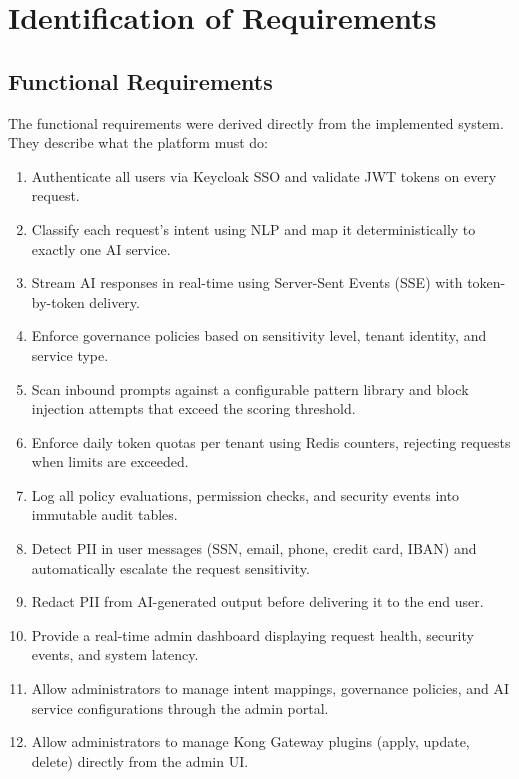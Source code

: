\section{Identification of Requirements}

\subsection{Functional Requirements}

The functional requirements were derived directly from the implemented system. They describe what the platform must do:

\begin{enumerate}
    \item Authenticate all users via Keycloak SSO and validate JWT tokens on every request.
    \item Classify each request's intent using NLP and map it deterministically to exactly one AI service.
    \item Stream AI responses in real-time using Server-Sent Events (SSE) with token-by-token delivery.
    \item Enforce governance policies based on sensitivity level, tenant identity, and service type.
    \item Scan inbound prompts against a configurable pattern library and block injection attempts that exceed the scoring threshold.
    \item Enforce daily token quotas per tenant using Redis counters, rejecting requests when limits are exceeded.
    \item Log all policy evaluations, permission checks, and security events into immutable audit tables.
    \item Detect PII in user messages (SSN, email, phone, credit card, IBAN) and automatically escalate the request sensitivity.
    \item Redact PII from AI-generated output before delivering it to the end user.
    \item Provide a real-time admin dashboard displaying request health, security events, and system latency.
    \item Allow administrators to manage intent mappings, governance policies, and AI service configurations through the admin portal.
    \item Allow administrators to manage Kong Gateway plugins (apply, update, delete) directly from the admin UI.
\end{enumerate}

